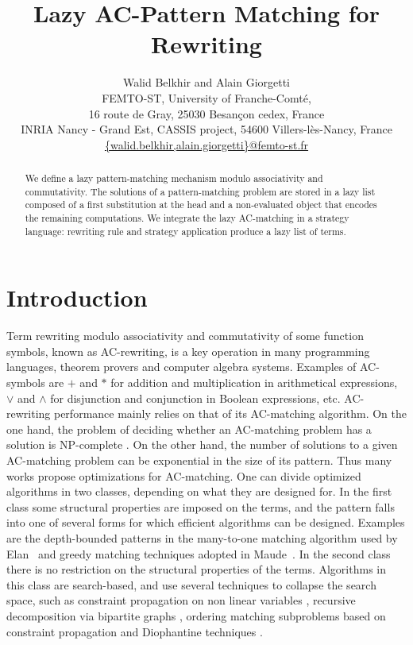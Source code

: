 \documentclass[submission,copyright,creativecommons]{eptcs}
\title{Lazy AC-Pattern Matching for Rewriting}
\author{Walid Belkhir and Alain Giorgetti\\
 FEMTO-ST, University of Franche-Comt\'{e},\\
  16 route de Gray, 25030 Besan\c{c}on cedex, France\\
INRIA Nancy - Grand Est, CASSIS project, 54600 Villers-l\`es-Nancy,
France\\
\url{{walid.belkhir,alain.giorgetti}@femto-st.fr}\\
}
\numberwithin{subcase}{case}
\begin{document}
\maketitle

\setlength{\abovecaptionskip}{-0.5cm}
\setlength{\belowcaptionskip}{-0.2cm}

\begin{abstract}
We define a lazy pattern-matching  mechanism  modulo associativity and commutativity. 
The solutions of a pattern-matching problem are stored in a lazy list composed of 
a first substitution at the head and  a non-evaluated object  that encodes  the
remaining  computations. We integrate the lazy AC-matching in a strategy language: 
 rewriting rule and strategy application produce a lazy list of terms.  
\end{abstract}

\section{Introduction}\label{Introduction:Sec}
Term rewriting modulo associativity and commutativity of some function symbols,
known as AC-rewri\-ting, is a key operation in many programming languages,
theorem provers and computer algebra systems. Examples of AC-symbols are $+$ and
$*$ for addition and multiplication in arithmetical expressions, $\lor$ and
$\land$ for disjunction and conjunction in Boolean expressions, etc.
AC-rewriting performance mainly relies on that of its AC-matching algorithm. On
the one hand, the problem of deciding whether an AC-matching problem has a
solution is NP-complete \cite{Benanav:1985:CMP}. On the other hand, the number of
solutions to a given AC-matching problem can be exponential in the size of its
pattern. Thus many works propose optimizations for AC-matching. One can divide
optimized algorithms in two classes, depending on what they are designed for. In
the first class  some structural properties are imposed on the terms, and the
pattern falls into one of several forms for which efficient algorithms can be
designed. Examples are the depth-bounded patterns in the many-to-one matching
algorithm used by Elan~\cite{Kirchner:2001:Promoting:AC} and greedy matching
techniques adopted in Maude~\cite{MaudeBook07}. In the second class there is no
restriction on the structural properties of the terms. Algorithms in this class
are search-based, and use several techniques to collapse the search space, such
as constraint propagation on non linear variables \cite{gramlich-unif88},
recursive decomposition via bipartite graphs \cite{Bipartie-Eker95}, ordering
matching subproblems based on constraint propagation \cite{Fast-Eker96}
 and Diophantine techniques \cite{Single-Eker02}.
 
\end{document}
